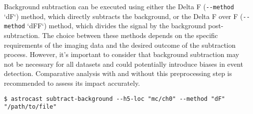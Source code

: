 Background subtraction can be executed using either the Delta F (\lstinline[style=bashStyle]{--method} `dF`) method,
which directly subtracts the background, or the Delta F over F (\lstinline[style=bashStyle]{--method} `dFF`) method,
which divides the signal by the background post-subtraction. The choice between these methods depends on the specific
requirements of the imaging data and the desired outcome of the subtraction process. However, it's important to
consider that background subtraction may not be necessary for all datasets and could potentially introduce biases in
event detection. Comparative analysis with and without this preprocessing step is recommended to assess its impact
accurately.

\begin{lstlisting}[style=bashStyle]
    $ astrocast subtract-background --h5-loc "mc/ch0" --method "dF" "/path/to/file"
\end{lstlisting}